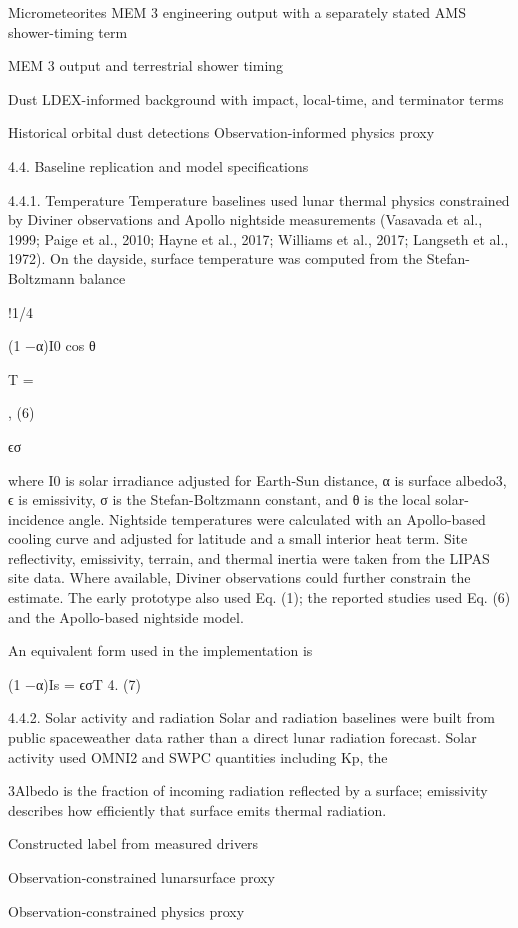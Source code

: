 Micrometeorites MEM 3 engineering output with a separately stated AMS shower-timing term

MEM 3 output and terrestrial shower timing

Dust LDEX-informed background with impact, local-time, and terminator terms

Historical orbital dust detections Observation-informed physics proxy

4.4. Baseline replication and model specifications

4.4.1. Temperature Temperature baselines used lunar thermal physics constrained by Diviner observations and Apollo nightside measurements (Vasavada et al., 1999; Paige et al., 2010; Hayne et al., 2017; Williams et al., 2017; Langseth et al., 1972). On the dayside, surface temperature was computed from the Stefan-Boltzmann balance

!1/4

(1 −α)I0 cos θ

T =

, (6)

ϵσ

where I0 is solar irradiance adjusted for Earth-Sun distance, α is surface albedo3, ϵ is emissivity, σ is the Stefan-Boltzmann constant, and θ is the local solar-incidence angle. Nightside temperatures were calculated with an Apollo-based cooling curve and adjusted for latitude and a small interior heat term. Site reflectivity, emissivity, terrain, and thermal inertia were taken from the LIPAS site data. Where available, Diviner observations could further constrain the estimate. The early prototype also used Eq. (1); the reported studies used Eq. (6) and the Apollo-based nightside model.

An equivalent form used in the implementation is

(1 −α)Is = ϵσT 4. (7)

4.4.2. Solar activity and radiation Solar and radiation baselines were built from public spaceweather data rather than a direct lunar radiation forecast. Solar activity used OMNI2 and SWPC quantities including Kp, the

3Albedo is the fraction of incoming radiation reflected by a surface; emissivity describes how efficiently that surface emits thermal radiation.

Constructed label from measured drivers

Observation-constrained lunarsurface proxy

Observation-constrained physics proxy

